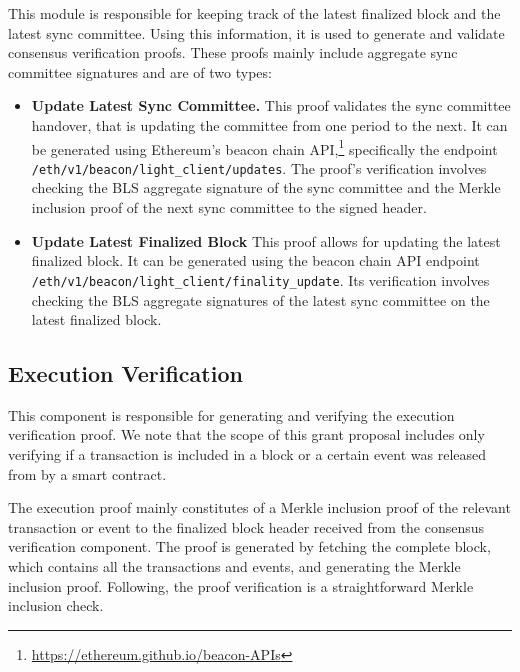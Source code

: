 This module is responsible for keeping track of the latest finalized block and
the latest sync committee. Using this information, it is used to generate and
validate consensus verification proofs. These proofs mainly include aggregate
sync committee signatures and are of two types:
\begin{itemize}
    \item \textbf{Update Latest Sync Committee.} This proof validates the sync
        committee handover, that is updating the committee from one period to
        the next. It can be generated using Ethereum's beacon chain API,\footnote{\url{https://ethereum.github.io/beacon-APIs}}
        specifically the endpoint\\
        \texttt{/eth/v1/beacon/light\_client/updates}.
        The proof's verification involves checking the BLS aggregate signature
        of the sync committee and the Merkle inclusion proof of the next sync
        committee to the signed header.
    \item \textbf{Update Latest Finalized Block} This proof allows for updating
        the latest finalized block. It can be generated using the beacon chain
        API endpoint\\\texttt{/eth/v1/beacon/light\_client/finality\_update}.
        Its verification involves checking the BLS aggregate signatures of the
        latest sync committee on the latest finalized block.
\end{itemize}

\subsection{Execution Verification}

This component is responsible for generating and verifying the execution
verification proof. We note that the scope of this grant proposal includes only
verifying if a transaction is included in a block or a certain event was
released from by a smart contract. 

The execution proof mainly constitutes of a Merkle inclusion proof of the
relevant transaction or event to the finalized block header received from the
consensus verification component. The proof is generated by fetching the
complete block, which contains all the transactions and events, and generating
the Merkle inclusion proof. Following, the proof verification is a
straightforward Merkle inclusion check.
